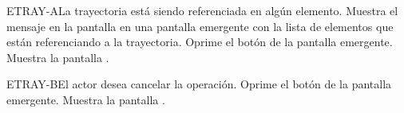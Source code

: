 	\begin{UCtrayectoriaA}{ETRAY-A}{La trayectoria está siendo referenciada en algún elemento.}
		\UCpaso[\UCsist] Muestra el mensaje  en la pantalla  en una pantalla emergente con la lista de elementos que están referenciando a la trayectoria.
		\UCpaso[\UCactor] Oprime el botón  de la pantalla emergente.
		\UCpaso[\UCsist] Muestra la pantalla .
	\end{UCtrayectoriaA}

	\begin{UCtrayectoriaA}{ETRAY-B}{El actor desea cancelar la operación.}
		\UCpaso[\UCactor] Oprime el botón  de la pantalla emergente.
		\UCpaso[\UCsist] Muestra la pantalla .
	\end{UCtrayectoriaA}
	

